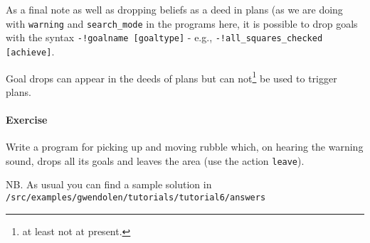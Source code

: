As a final note as well as dropping beliefs as a deed in plans (as we are doing with \lstinline{warning} and \lstinline{search_mode} in the programs here, it is possible to drop goals with the syntax \lstinline{-!goalname [goaltype]} - e.g., \lstinline{-!all_squares_checked [achieve]}.

Goal drops can appear in the deeds of plans but can not\footnote{at least not at present.} be  used to trigger plans.

\paragraph{Exercise} Write a program for picking up and moving rubble which, on hearing the warning sound, drops all its goals and leaves the area (use the action \texttt{leave}).

\begin{sloppypar}
NB. As usual you can find a sample solution in \texttt{/src/examples/gwendolen/tutorials/tutorial6/answers}
\end{sloppypar}

